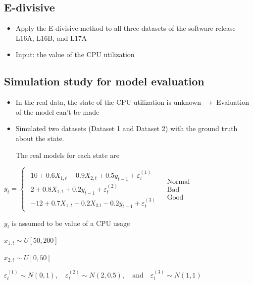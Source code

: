 \documentclass{beamer}
\begin{document}
\subsection{E-divisive}
\begin{frame}

\begin{itemize}
	\item Apply the E-divisive method to all three datasets of the software release L16A, L16B, and L17A
	\item Input: the value of the CPU utilization
\end{itemize}
	
\end{frame}

\subsection{Simulation study for model evaluation}
\begin{frame}
\begin{itemize}
	\item In the real data, the state of the CPU utilization is unknown $\rightarrow$ Evaluation of the model can't be made
	\pause
	
	\item Simulated two datasets (Dataset 1 and Dataset 2) with the ground truth about the state. 
	
	The real models for each state are
\end{itemize}

$y_{t}=\begin{cases}
\begin{array}{c}
10+0.6X_{1,t}-0.9X{}_{2,t}+0.5y_{t-1}+\varepsilon_{t}^{(1)}\\
2+0.8X_{1,t}+0.2y_{t-1}+\varepsilon_{t}^{(2)}\\
-12+0.7X_{1,t}+0.2X{}_{2.t}-0.2y_{t-1}+\varepsilon_{t}^{(3)}
\end{array} & \begin{array}{c}
\mathrm{Normal}\\
\mathrm{Bad}\\
\mathrm{Good}
\end{array}\end{cases}$
\vspace{1em}

$y_{t}$ is assumed to be value of a CPU usage

$x_{1,t}\sim U[50,200]$

$x_{2,t}\sim U[0,50]$ 

$\varepsilon_{t}^{(1)}\sim N(0,1),\quad \varepsilon_{t}^{(2)}\sim N(2,0.5),\quad \mathrm{and} \quad \varepsilon_{t}^{(3)}\sim N(1,1)$

\end{frame}
\end{document}
